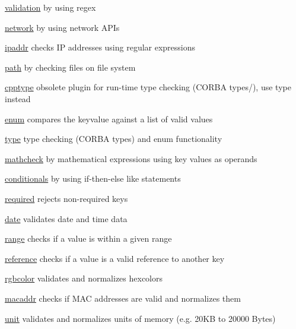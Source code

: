 \begin{DoxyItemize}
\item \hyperlink{md_src_plugins_validation_README_src_plugins_validation_README_md}{validation} by using regex
\item \hyperlink{md_src_plugins_network_README_src_plugins_network_README_md}{network} by using network A\+P\+Is
\item \hyperlink{md_src_plugins_ipaddr_README_src_plugins_ipaddr_README_md}{ipaddr} checks IP addresses using regular expressions
\item \hyperlink{md_src_plugins_path_README_src_plugins_path_README_md}{path} by checking files on file system
\item \hyperlink{md_src_plugins_cpptype_README_src_plugins_cpptype_README_md}{cpptype} obsolete plugin for run-\/time type checking (C\+O\+R\+BA types/), use {\ttfamily type} instead
\item \hyperlink{md_src_plugins_enum_README_src_plugins_enum_README_md}{enum} compares the keyvalue against a list of valid values
\item \hyperlink{md_src_plugins_type_README_src_plugins_type_README_md}{type} type checking (C\+O\+R\+BA types) and enum functionality
\item \hyperlink{md_src_plugins_mathcheck_README_src_plugins_mathcheck_README_md}{mathcheck} by mathematical expressions using key values as operands
\item \hyperlink{md_src_plugins_conditionals_README_src_plugins_conditionals_README_md}{conditionals} by using if-\/then-\/else like statements
\item \hyperlink{md_src_plugins_required_README_src_plugins_required_README_md}{required} rejects non-\/required keys
\item \hyperlink{md_src_plugins_date_README_src_plugins_date_README_md}{date} validates date and time data
\item \hyperlink{md_src_plugins_range_README_src_plugins_range_README_md}{range} checks if a value is within a given range
\item \hyperlink{md_src_plugins_reference_README_src_plugins_reference_README_md}{reference} checks if a value is a valid reference to another key
\item \hyperlink{md_src_plugins_rgbcolor_README_src_plugins_rgbcolor_README_md}{rgbcolor} validates and normalizes hexcolors
\item \hyperlink{md_src_plugins_macaddr_README_src_plugins_macaddr_README_md}{macaddr} checks if M\+AC addresses are valid and normalizes them
\item \hyperlink{md_src_plugins_unit_README_src_plugins_unit_README_md}{unit} validates and normalizes units of memory (e.\+g. 20\+KB to 20000 Bytes)
\end{DoxyItemize}

